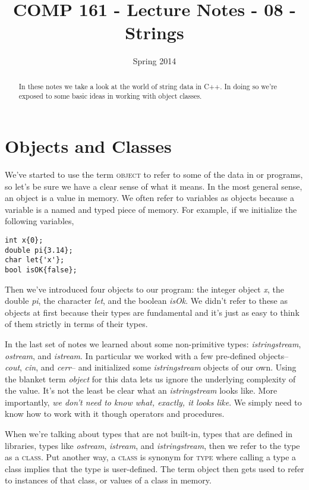 \documentclass[]{tufte-handout}
\title{COMP 161 - Lecture Notes - 08 - Strings}
\date{Spring 2014}
\begin{document}
 
\maketitle

\begin{abstract}
In these notes we take a look at the world of string data in C++.  In doing so we're exposed to some basic ideas in working with object classes.
\end{abstract}

\section{Objects and Classes}

We've started to use the term \textsc{object} to refer to some of the data in or programs, so let's be sure we have a clear sense of what it means.  In the most general sense, an object is a value in memory. We often refer to variables as objects because a variable is a named and typed piece of memory. For example, if we initialize the following variables,
\begin{verbatim}
int x{0};
double pi{3.14};
char let{'x'};
bool isOK{false};
\end{verbatim} 
Then we've introduced four objects to our program: the integer object \textit{x}, the double \textit{pi}, the character \textit{let}, and the boolean \textit{isOk}.  We didn't refer to these as objects at first because their types are fundamental and it's just as easy to think of them strictly in terms of their types.  

In the last set of notes we learned about some non-primitive types: \textit{istringstream}, \textit{ostream}, and \textit{istream}.  In particular we worked with a few pre-defined objects-- \textit{cout}, \textit{cin}, and \textit{cerr}-- and initialized some \textit{istringstream} objects of our own. Using the blanket term \textit{object} for this data lets us ignore the underlying complexity of the value. It's not the least be clear what an \textit{istringstream} looks like. More importantly, \textit{we don't need to know what, exactly, it looks like}. We simply need to know how to work with it though operators and procedures. 

When we're talking about types that are not built-in, types that are defined in libraries, types like \textit{ostream}, \textit{istream}, and \textit{istringstream}, then we refer to the type as a \textsc{class}.  Put another way, a \textsc{class} is synonym for \textsc{type} where calling a type a class implies that the type is user-defined.  The term object then gets used to refer to instances of that class, or values of a class in memory. 
\end{document}
